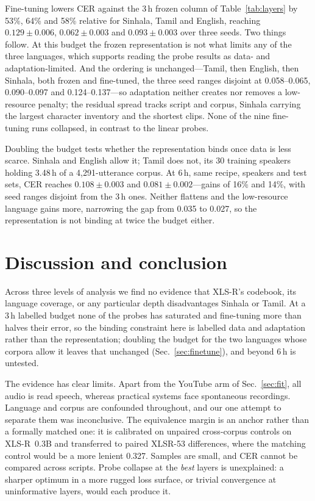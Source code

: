 \documentclass{article}
\begin{document}
Fine-tuning lowers CER against the 3\,h frozen column of Table~\ref{tab:layers} by 53\%, 64\% and 58\% relative for Sinhala, Tamil and English, reaching $0.129\pm0.006$, $0.062\pm0.003$ and $0.093\pm0.003$ over three seeds. Two things follow. At this budget the frozen representation is not what limits any of the three languages, which supports reading the probe results as data- and adaptation-limited. And the ordering is unchanged---Tamil, then English, then Sinhala, both frozen and fine-tuned, the three seed ranges disjoint at 0.058--0.065, 0.090--0.097 and 0.124--0.137---so adaptation neither creates nor removes a low-resource penalty; the residual spread tracks script and corpus, Sinhala carrying the largest character inventory and the shortest clips. None of the nine fine-tuning runs collapsed, in contrast to the linear probes.

Doubling the budget tests whether the representation binds once data is less scarce. Sinhala and English allow it; Tamil does not, its 30 training speakers holding 3.48\,h of a 4,291-utterance corpus. At 6\,h, same recipe, speakers and test sets, CER reaches $0.108\pm0.003$ and $0.081\pm0.002$---gains of 16\% and 14\%, with seed ranges disjoint from the 3\,h ones. Neither flattens and the low-resource language gains more, narrowing the gap from 0.035 to 0.027, so the representation is not binding at twice the budget either.

\section{Discussion and conclusion}
\label{sec:discussion}

Across three levels of analysis we find no evidence that XLS-R's codebook, its language coverage, or any particular depth disadvantages Sinhala or Tamil. At a 3\,h labelled budget none of the probes has saturated and fine-tuning more than halves their error, so the binding constraint here is labelled data and adaptation rather than the representation; doubling the budget for the two languages whose corpora allow it leaves that unchanged (Sec.~\ref{sec:finetune}), and beyond 6\,h is untested.

The evidence has clear limits. Apart from the YouTube arm of Sec.~\ref{sec:fit}, all audio is read speech, whereas practical systems face spontaneous recordings. Language and corpus are confounded throughout, and our one attempt to separate them was inconclusive. The equivalence margin is an anchor rather than a formally matched one: it is calibrated on unpaired cross-corpus controls on XLS-R~0.3B and transferred to paired XLSR-53 differences, where the matching control would be a more lenient 0.327. Samples are small, and CER cannot be compared across scripts. Probe collapse at the \emph{best} layers is unexplained: a sharper optimum in a more rugged loss surface, or trivial convergence at uninformative layers, would each produce it.
\end{document}
